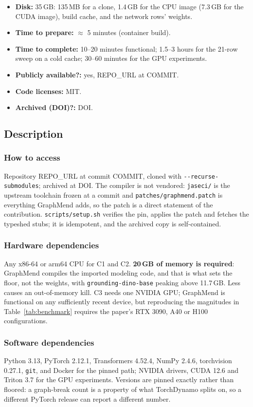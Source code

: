 {\begin{itemize}
    but are not claims.
  \item {\bf Disk:} 35\,GB: 135\,MB for a clone, 1.4\,GB for the CPU image
    (7.3\,GB for the CUDA image), build cache, and the network rows' weights.
  \item {\bf Time to prepare:} $\approx$ 5 minutes (container build).
  \item {\bf Time to complete:} 10--20 minutes functional; 1.5--3 hours for the
    21-row sweep on a cold cache; 30--60 minutes for the GPU experiments.
  \item {\bf Publicly available?:} yes, {{REPO\_URL}} at {{COMMIT}}.
  \item {\bf Code licenses:} MIT.
  \item {\bf Archived (DOI)?:} {{DOI}}.
\end{itemize}
}

\subsection{Description}

\subsubsection{How to access}
Repository {{REPO\_URL}} at commit {{COMMIT}}, cloned with
\texttt{-{}-recurse-submodules}; archived at {{DOI}}. The compiler is not
vendored: \texttt{jaseci/} is the upstream toolchain frozen at a commit and
\texttt{patches/graphmend.patch} is everything GraphMend adds, so the patch is a
direct statement of the contribution. \texttt{scripts/setup.sh} verifies the
pin, applies the patch and fetches the typeshed stubs; it is idempotent, and the
archived copy is self-contained.

\subsubsection{Hardware dependencies}
Any x86-64 or arm64 CPU for C1 and C2. \textbf{20\,GB of memory is required}:
GraphMend compiles the imported modeling code, and that is what sets the floor,
not the weights, with \texttt{grounding-dino-base} peaking above 11.7\,GB.
Less causes an out-of-memory kill. C3 needs one NVIDIA GPU; GraphMend is functional on any sufficiently
recent device, but reproducing the magnitudes in Table~\ref{tab:benchmark}
requires the paper's RTX 3090, A40 or H100 configurations.

\subsubsection{Software dependencies}
Python 3.13, PyTorch 2.12.1, Transformers 4.52.4, NumPy 2.4.6, torchvision
0.27.1, \texttt{git}, and Docker for the pinned path; NVIDIA drivers, CUDA 12.6
and Triton 3.7 for the GPU experiments. Versions are pinned exactly rather than
floored: a graph-break count is a property of what TorchDynamo splits on, so a
different PyTorch release can report a different number.

